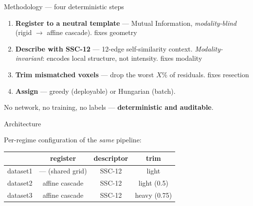 \documentclass[aspectratio=169,11pt]{beamer}
\begin{document}
\begin{frame}{Methodology — four deterministic steps}
  \begin{enumerate}
    \item[\textbf{1.}] \textbf{Register to a neutral template} — Mutual Information, \emph{modality-blind} (rigid $\to$ affine cascade). \hfill{\footnotesize\color{acc}fixes geometry}
    \item[\textbf{2.}] \textbf{Describe with SSC-12} — 12-edge self-similarity context. \emph{Modality-invariant}: encodes local structure, not intensity. \hfill{\footnotesize\color{acc}fixes modality}
    \item[\textbf{3.}] \textbf{Trim mismatched voxels} — drop the worst $X\%$ of residuals. \hfill{\footnotesize\color{acc}fixes resection}
    \item[\textbf{4.}] \textbf{Assign} — greedy (deployable) or Hungarian (batch).
  \end{enumerate}
  \vfill
  \begin{center}\small No network, no training, no labels — \textbf{deterministic and auditable}.\end{center}
\end{frame}

\begin{frame}{Architecture}
  \centering
  \vfill
  \begin{flushleft}\footnotesize Per-regime configuration of the \emph{same} pipeline:\end{flushleft}
  \begin{center}\small
  \begin{tabular}{lccc}
    \toprule
     & \textbf{register} & \textbf{descriptor} & \textbf{trim} \\
    \midrule
    dataset1 & — (shared grid) & SSC-12 & light \\
    dataset2 & affine cascade & SSC-12 & light (0.5) \\
    dataset3 & affine cascade & SSC-12 & \alert{heavy (0.75)} \\
    \bottomrule
  \end{tabular}
  \end{center}
\end{frame}
\end{document}
